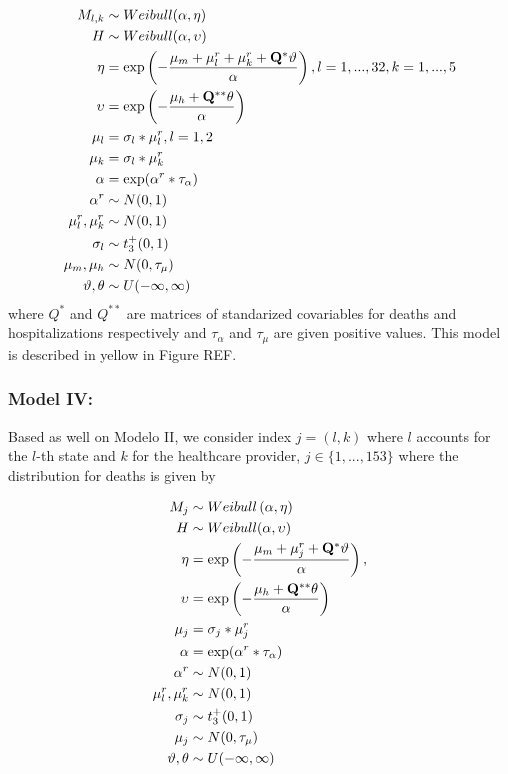 \documentclass[10pt,letterpaper]{article}
\begin{document}
\[
\begin{aligned}
 M_{l,k}   &\sim Weibull(\alpha,\mathbf{\eta})\\
 H  &\sim Weibull(\alpha,\mathbf{\upsilon}) \\
 \mathbf{\eta} &= \exp \left(-\frac{\mu_m+\mathbf{\mu}_l^r+\mathbf{\mu}_k^r+\mathbf{Q}^*\mathbf{\vartheta}}{\alpha} \right),\space\space l=1,...,32,\space k=1,...,5\\
 \mathbf{\upsilon} &= \exp\left(-\frac{\mu_h+\mathbf{Q}^{**}\mathbf{\theta}}{\alpha}\right) \\
  \mathbf{\mu}_l&=\sigma_l*\mathbf{\mu}_l^r, \space\space l=1,2 \\
 \mathbf{\mu}_k&=\sigma_l*\mathbf{\mu}_k^r \\
 \alpha&=\exp(\alpha^r*\tau_\alpha) \\
 \alpha^r&\sim N(0,1) \\
 \mu^r_l,\mu^r_k &\sim N(0,1) \\
 \sigma_l&\sim t^+_3(0,1) \\
 \mu_m,\mu_h &\sim N(0,\tau_\mu) \\
 \mathbf{\vartheta},\mathbf{\theta} &\sim U(-\infty,\infty) \\
\end{aligned}
\] where \(Q^*\) and \(Q^{**}\) are matrices of standarized covariables
for deaths and hospitalizations respectively and \(\tau_\alpha\) and
\(\tau_{\mu}\) are given positive values. This model is described in
yellow in Figure REF.

\subsubsection{Model IV:}\label{model-iv}

Based as well on Modelo II, we consider index \(j=(l,k)\) where \(l\)
accounts for the \(l\)-th state and \(k\) for the healthcare provider,
\(j \in \{1,...,153\}\) where the distribution for deaths is given by

\[
\begin{aligned}
 M_j &\sim Weibull\left(\alpha, \mathbf{\eta} \right) \\
 H  &\sim Weibull(\alpha,\mathbf{\upsilon}) \\
 \mathbf{\eta} &= \exp \left(-\frac{\mu_m+\mathbf{\mu}_j^r+\mathbf{Q}^*\mathbf{\vartheta}}{\alpha} \right),\space\\
 \mathbf{\upsilon} &= \exp\left(-\frac{\mu_h+\mathbf{Q}^{**}\mathbf{\theta}}{\alpha}\right) \\
 \mathbf{\mu}_j&=\sigma_j*\mathbf{\mu}_j^r \\
 \alpha&=\exp(\alpha^r*\tau_\alpha) \\
 \alpha^r&\sim N(0,1) \\
 \mu^r_l,\mu^r_k &\sim N(0,1) \\
 \sigma_j&\sim t^+_3(0,1) \\
 \mu_j &\sim N(0,\tau_\mu) \\
 \mathbf{\vartheta},\mathbf{\theta} &\sim U(-\infty,\infty) \\
\end{aligned}
\]
\end{document}
